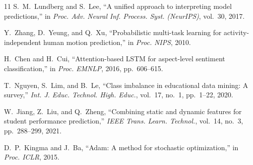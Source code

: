 \documentclass[conference]{IEEEtran}
\begin{document}
\begin{thebibliography}{11}
S.~M.~Lundberg and S.~Lee, ``A unified approach to interpreting model predictions,'' in \textit{Proc. Adv. Neural Inf. Process. Syst. (NeurIPS)}, vol.~30, 2017.

Y.~Zhang, D.~Yeung, and Q.~Xu, ``Probabilistic multi-task learning for activity-independent human motion prediction,'' in \textit{Proc. NIPS}, 2010.

H.~Chen and H.~Cui, ``Attention-based LSTM for aspect-level sentiment classification,'' in \textit{Proc. EMNLP}, 2016, pp.~606--615.

T.~Nguyen, S.~Lim, and B.~Le, ``Class imbalance in educational data mining: A survey,'' \textit{Int. J. Educ. Technol. High. Educ.}, vol.~17, no.~1, pp.~1--22, 2020.

W.~Jiang, Z.~Liu, and Q.~Zheng, ``Combining static and dynamic features for student performance prediction,'' \textit{IEEE Trans. Learn. Technol.}, vol.~14, no.~3, pp.~288--299, 2021.

D.~P.~Kingma and J.~Ba, ``Adam: A method for stochastic optimization,'' in \textit{Proc. ICLR}, 2015.

\end{thebibliography}
\end{document}
